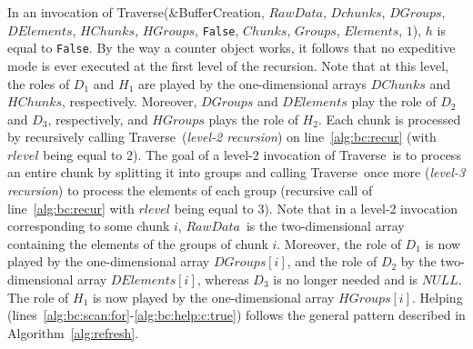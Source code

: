 \documentclass[a4paper,11pt,twoside,openany]{book}
\newcommand{\False}{\mbox{\texttt{False}}}
\newcommand{\Traverse}{\mbox{\sc Traverse}}
\newcommand{\BufferCreation}{\mbox{\sc BufferCreation}}
\newcommand{\RawData}{\mbox{$\mathit{RawData}$}}
\begin{document}
% 
In an invocation of
\Traverse(\&\BufferCreation, \RawData, $\mathit{Dchunks}$, $\mathit{DGroups}$, $\mathit{DElements}$,
$\mathit{HChunks}$, $\mathit{HGroups}$, \False, $\mathit{Chunks}$, $\mathit{Groups}$, $\mathit{Elements}$, $1$),
$h$ is equal to \False. By the way a counter object works, it follows that 
no expeditive mode is ever executed at the first level of the recursion.
Note that at this level, the roles of $D_1$ and $H_1$ are played by the one-dimensional arrays
$DChunks$ and $HChunks$, respectively. Moreover, $DGroups$ and $DElements$ play the role of $D_2$ and $D_3$,
respectively, and $HGroups$ plays the role of $H_2$. Each chunk is processed by recursively calling
\Traverse\ ({\em level-2 recursion}) on line~\ref{alg:bc:recur} (with $\mathit{rlevel}$ being equal to $2$). 
The goal of a level-2 invocation of \Traverse\
is to process an entire chunk by splitting it into groups and calling
\Traverse\ once more ({\em level-3 recursion}) to process the elements of each group 
(recursive call of line~\ref{alg:bc:recur} with $\mathit{rlevel}$ being equal to $3$). 
Note that in a level-2 invocation corresponding to some chunk $i$, 
\RawData\ is the two-dimensional array containing the elements of the groups of chunk $i$.
Moreover, the role of $D_1$ is now played by the one-dimensional array $DGroups[i]$, 
and the role of $D_2$ by the two-dimensional array $DElements[i]$,
whereas $D_3$ is no longer needed and is $\mathit{NULL}$.
The role of $H_1$ is now played by the one-dimensional array $HGroups[i]$. 
Helping (lines~\ref{alg:bc:scan:for}-\ref{alg:bc:help:c:true}) follows the general pattern
described in Algorithm~\ref{alg:refresh}. 

\end{document}
